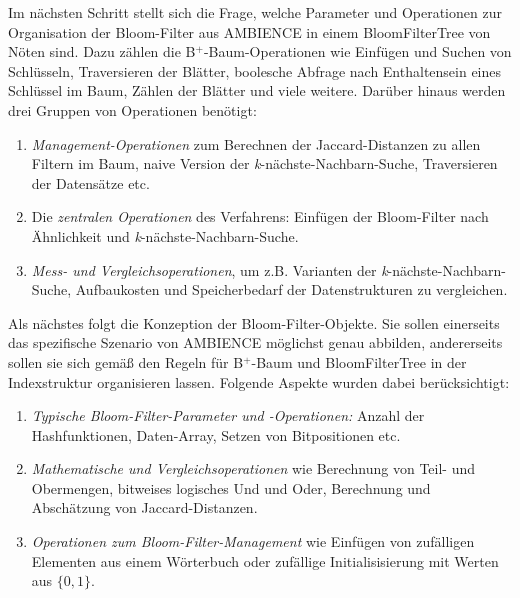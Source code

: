 \noindent
Im nächsten Schritt stellt sich die Frage, welche Parameter und Operationen zur Organisation der Bloom-Filter aus AMBIENCE in einem BloomFilterTree von Nöten sind. Dazu zählen die B$^+$-Baum-Operationen wie Einfügen und Suchen von Schlüsseln, Traversieren der Blätter, boolesche Abfrage nach Enthaltensein eines Schlüssel im Baum, Zählen der Blätter und viele weitere. Darüber hinaus werden drei Gruppen von Operationen benötigt: 
\newpage
\begin{enumerate}
\setlength{\itemsep}{20pt}
	\item \textit{Management-Operationen} zum Berechnen der Jaccard-Distanzen zu allen Filtern im Baum, naive Version der \textit{k}-nächste-Nachbarn-Suche, Traversieren der Datensätze etc.
	\item Die \textit{zentralen Operationen} des Verfahrens: Einfügen der Bloom-Filter nach Ähnlichkeit und \textit{k}-nächste-Nachbarn-Suche. 
	\item \textit{Mess- und Vergleichsoperationen}, um z.B. Varianten der \textit{k}-nächste-Nachbarn-Suche, Aufbaukosten und Speicherbedarf der Datenstrukturen zu vergleichen. 
\end{enumerate}

\noindent
Als nächstes folgt die Konzeption der Bloom-Filter-Objekte. Sie sollen einerseits das spezifische Szenario von AMBIENCE möglichst genau abbilden, andererseits sollen sie sich gemäß den Regeln für B$^+$-Baum und BloomFilterTree in der Indexstruktur organisieren lassen. Folgende Aspekte wurden dabei berücksichtigt: 
\begin{enumerate}
\setlength{\itemsep}{20pt}
	\item \textit{Typische Bloom-Filter-Parameter und -Operationen:} Anzahl der Hashfunktionen, Daten-Array, Setzen von Bitpositionen etc.
	\item \textit{Mathematische und Vergleichsoperationen} wie Berechnung von Teil- und Obermengen, bitweises logisches Und und Oder, Berechnung und Abschätzung von Jaccard-Distanzen.
	\item \textit{Operationen zum Bloom-Filter-Management} wie Einfügen von zufälligen Elementen aus einem Wörterbuch oder zufällige Initialisisierung mit Werten aus $\{0,1\}$.
\end{enumerate}
